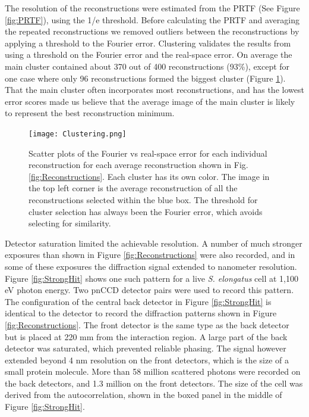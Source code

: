 The resolution of the reconstructions were estimated from the PRTF (See Figure \ref{fig:PRTF}), using the 1/e threshold. Before calculating the PRTF and averaging the repeated reconstructions we removed outliers between the reconstructions by applying a threshold to the Fourier error. Clustering validates the results from using a threshold on the Fourier error and the real-space error. On average the main cluster contained about 370 out of 400 reconstructions (93\%), except for one case where only 96 reconstructions formed the biggest cluster (Figure \ref{fig:Clustering}). That the main cluster often incorporates most reconstructions, and has the lowest error scores made us believe that the average image of the main cluster is likely to represent the best reconstruction minimum. 

\begin{figure}[!h]
	\centering 
		\texttt{[image: Clustering.png]}
	\caption{Scatter plots of the Fourier vs real-space error for each individual reconstruction for each average reconstruction shown in Fig. \ref{fig:Reconstructions}. Each cluster has its own color. The image in the top left corner is the average reconstruction of all the reconstructions selected within the blue box. The threshold for cluster selection has always been the Fourier error, which avoids selecting for similarity. }
	\label{fig:Clustering}
\end{figure}

Detector saturation limited the achievable resolution. A number of much stronger exposures than shown in Figure \ref{fig:Reconstructions} were also recorded, and in some of these exposures the diffraction signal extended to nanometer resolution. Figure \ref{fig:StrongHit} shows one such pattern for a live \textit{S. elongatus} cell at 1,100 eV photon energy. Two pnCCD detector pairs were used to record this pattern. The configuration of the central back detector in Figure \ref{fig:StrongHit} is identical to the detector to record the diffraction patterns shown in Figure \ref{fig:Reconstructions}. The front detector is the same type as the back detector but is placed at 220 mm from the interaction region. A large part of the back detector was saturated, which prevented reliable phasing. The signal however extended beyond 4 nm resolution on the front detectors, which is the size of a small protein molecule. More than 58 million scattered photons were recorded on the back detectors, and 1.3 million on the front detectors. The size of the cell was derived from the autocorrelation, shown in the boxed panel in the middle of Figure \ref{fig:StrongHit}. 

